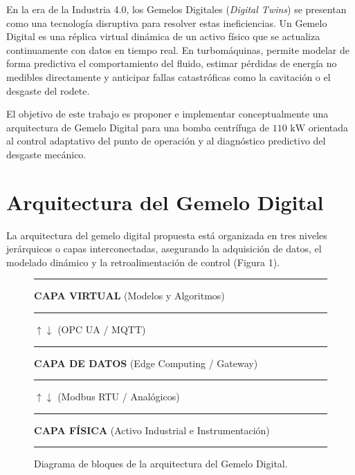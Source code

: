 \documentclass[11pt,twocolumn,a4paper]{article}
\newcommand{\hrules}{\rule{\linewidth}{0.5mm}}
\begin{document}
En la era de la Industria 4.0, los Gemelos Digitales (\textit{Digital Twins}) se presentan como una tecnología disruptiva para resolver estas ineficiencias. Un Gemelo Digital es una réplica virtual dinámica de un activo físico que se actualiza continuamente con datos en tiempo real. En turbomáquinas, permite modelar de forma predictiva el comportamiento del fluido, estimar pérdidas de energía no medibles directamente y anticipar fallas catastróficas como la cavitación o el desgaste del rodete.

El objetivo de este trabajo es proponer e implementar conceptualmente una arquitectura de Gemelo Digital para una bomba centrífuga de $110\text{ kW}$ orientada al control adaptativo del punto de operación y al diagnóstico predictivo del desgaste mecánico.

\section{Arquitectura del Gemelo Digital}
La arquitectura del gemelo digital propuesta está organizada en tres niveles jerárquicos o capas interconectadas, asegurando la adquisición de datos, el modelado dinámico y la retroalimentación de control (Figura 1).

\begin{figure}[H]
\centering
\hrules
\vspace{0.2cm}
\textbf{CAPA VIRTUAL} (Modelos y Algoritmos)
\vspace{0.2cm}
\hrules
\vspace{0.1cm}
$\uparrow \downarrow$ (OPC UA / MQTT)
\vspace{0.1cm}
\hrules
\vspace{0.2cm}
\textbf{CAPA DE DATOS} (Edge Computing / Gateway)
\vspace{0.2cm}
\hrules
\vspace{0.1cm}
$\uparrow \downarrow$ (Modbus RTU / Analógicos)
\vspace{0.1cm}
\hrules
\vspace{0.2cm}
\textbf{CAPA FÍSICA} (Activo Industrial e Instrumentación)
\vspace{0.2cm}
\hrules
\caption{Diagrama de bloques de la arquitectura del Gemelo Digital.}
\end{figure}
\end{document}
